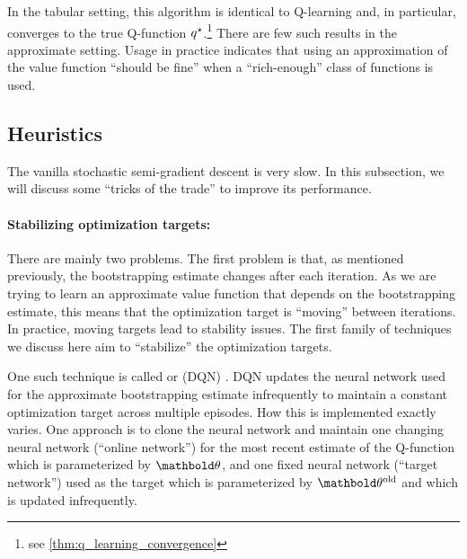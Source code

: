 In the tabular setting, this algorithm is identical to Q-learning and, in particular, converges to the true Q-function $\fnq[\star]$.\footnote{see \cref{thm:q_learning_convergence}}
There are few such results in the approximate setting. Usage in practice indicates that using an approximation of the value function ``should be fine'' when a ``rich-enough'' class of functions is used.

\subsection{Heuristics}\label{sec:mfarl:value_function_approximation:heuristics}

The vanilla stochastic semi-gradient descent is very slow.
In this subsection, we will discuss some ``tricks of the trade'' to improve its performance.

\paragraph{Stabilizing optimization targets:}

There are mainly two problems.
The first problem is that, as mentioned previously, the bootstrapping estimate changes after each iteration.
As we are trying to learn an approximate value function that depends on the bootstrapping estimate, this means that the optimization target is ``moving'' between iterations.
In practice, moving targets lead to stability issues.
The first family of techniques we discuss here aim to ``stabilize'' the optimization targets.

One such technique is called  or  (DQN) \citep{mnih2015human}.
DQN updates the neural network used for the approximate bootstrapping estimate infrequently to maintain a constant optimization target across multiple episodes.
How this is implemented exactly varies.
One approach is to clone the neural network and maintain one changing neural network (``online network'') for the most recent estimate of the Q-function which is parameterized by $\vtheta$, and one fixed neural network (``target network'') used as the target which is parameterized by $\old{\vtheta}$ and which is updated infrequently.


